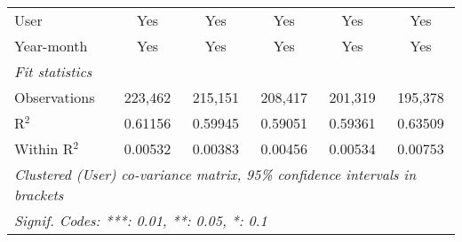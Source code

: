 \begin{table}[htbp]
\begin{threeparttable}[b]
\begin{tabular}{lccccc}
         User                         & Yes             & Yes             & Yes             & Yes             & Yes\\  
         Year-month                   & Yes             & Yes             & Yes             & Yes             & Yes\\  
         \midrule
         \emph{Fit statistics}\\
         Observations                 & 223,462         & 215,151         & 208,417         & 201,319         & 195,378\\  
         R$^2$                        & 0.61156         & 0.59945         & 0.59051         & 0.59361         & 0.63509\\  
         Within R$^2$                 & 0.00532         & 0.00383         & 0.00456         & 0.00534         & 0.00753\\  
         \midrule \midrule
         \multicolumn{6}{l}{\emph{Clustered (User) co-variance matrix, 95\% confidence intervals in brackets}}\\
         \multicolumn{6}{l}{\emph{Signif. Codes: ***: 0.01, **: 0.05, *: 0.1}}\\
      \end{tabular}
   \end{threeparttable}
\end{table}


